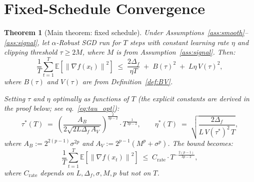 \documentclass[11pt]{article}
\newtheorem{theorem}{Theorem}
\theoremstyle{definition}
\newcommand{\E}{\mathbb{E}}
\newcommand{\norm}[1]{\left\| #1 \right\|}
\begin{document}
\section{Fixed-Schedule Convergence}
\label{sec:fixed}

\begin{theorem}[Main theorem: fixed schedule]\label{thm:fixed}
Under Assumptions~\ref{ass:smooth}--\ref{ass:signal}, let $\alpha$-Robust SGD
run for $T$ steps with constant learning rate $\eta$ and clipping threshold
$\tau \geq 2M$, where $M$ is from Assumption~\ref{ass:signal}. Then:
\begin{equation}\label{eq:general_bound}
  \frac{1}{T}\sum_{t=1}^{T}\E\!\left[\norm{\nabla f(x_t)}^2\right]
  \;\leq\;
  \frac{2\Delta_f}{\eta T}
  \;+\; B(\tau)^2
  \;+\; L\eta\, V(\tau)^2,
\end{equation}
where $B(\tau)$ and $V(\tau)$ are from Definition~\ref{def:BV}.

\medskip

Setting $\tau$ and $\eta$ optimally as functions of $T$ (the explicit
constants are derived in the proof below; see eq.~\eqref{eq:tau_opt}):
\begin{equation}\label{eq:optimal_rate}
  \tau^*(T) \;=\; \left(\frac{A_B}{2\sqrt{2L\Delta_f\,A_V}}\right)^{\!\frac{2}{3p-2}}
    \cdot T^{\frac{1}{3p-2}},
  \qquad
  \eta^*(T) \;=\; \sqrt{\frac{2\Delta_f}{L\, V(\tau^*)^2\, T}},
\end{equation}
where $A_B := 2^{2(p-1)}\sigma^{2p}$ and $A_V := 2^{p-1}(M^p+\sigma^p)$. The
bound becomes:
\begin{equation}\label{eq:rate}
  \frac{1}{T}\sum_{t=1}^{T}\E\!\left[\norm{\nabla f(x_t)}^2\right]
  \;\leq\;
  C_{\mathrm{rate}} \cdot T^{-\frac{2(p-1)}{3p-2}},
\end{equation}
where $C_{\mathrm{rate}}$ depends on $L, \Delta_f, \sigma, M, p$ but not on $T$.
\end{theorem}
\end{document}
